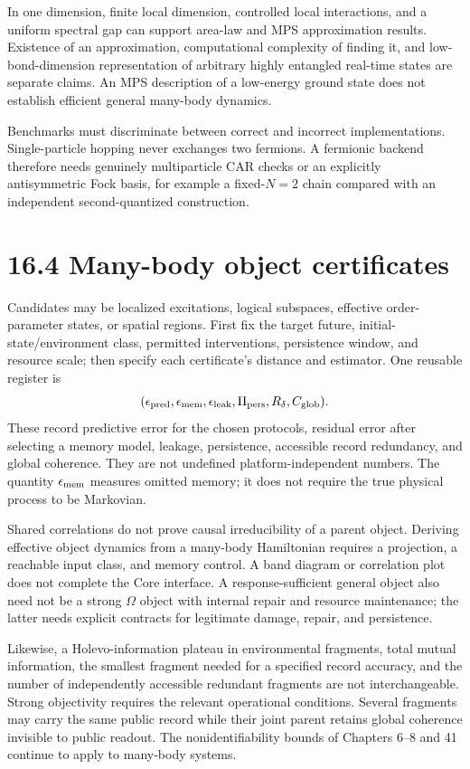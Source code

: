 \documentclass[
  11pt,
  oneside]{book}
\begin{document}
In one dimension, finite local dimension, controlled local interactions,
and a uniform spectral gap can support area-law and MPS approximation
results. Existence of an approximation, computational complexity of
finding it, and low-bond-dimension representation of arbitrary highly
entangled real-time states are separate claims. An MPS description of a
low-energy ground state does not establish efficient general many-body
dynamics.

Benchmarks must discriminate between correct and incorrect
implementations. Single-particle hopping never exchanges two fermions. A
fermionic backend therefore needs genuinely multiparticle CAR checks or
an explicitly antisymmetric Fock basis, for example a fixed-\(N=2\)
chain compared with an independent second-quantized construction.

\section{16.4 Many-body object certificates}

Candidates may be localized excitations, logical subspaces, effective
order-parameter states, or spatial regions. First fix the target future,
initial-state/environment class, permitted interventions, persistence
window, and resource scale; then specify each certificate's distance and
estimator. One reusable register is \[
(\epsilon_{\rm pred},\epsilon_{\rm mem},\epsilon_{\rm leak},
\Pi_{\rm pers},R_\delta,C_{\rm glob}).
\] These record predictive error for the chosen protocols, residual
error after selecting a memory model, leakage, persistence, accessible
record redundancy, and global coherence. They are not undefined
platform-independent numbers. The quantity \(\epsilon_{\rm mem}\)
measures omitted memory; it does not require the true physical process
to be Markovian.

Shared correlations do not prove causal irreducibility of a parent
object. Deriving effective object dynamics from a many-body Hamiltonian
requires a projection, a reachable input class, and memory control. A
band diagram or correlation plot does not complete the Core interface. A
response-sufficient general object also need not be a strong \(\Omega\)
object with internal repair and resource maintenance; the latter needs
explicit contracts for legitimate damage, repair, and persistence.

Likewise, a Holevo-information plateau in environmental fragments, total
mutual information, the smallest fragment needed for a specified record
accuracy, and the number of independently accessible redundant fragments
are not interchangeable. Strong objectivity requires the relevant
operational conditions. Several fragments may carry the same public
record while their joint parent retains global coherence invisible to
public readout. The nonidentifiability bounds of Chapters 6--8 and 41
continue to apply to many-body systems.
\end{document}
